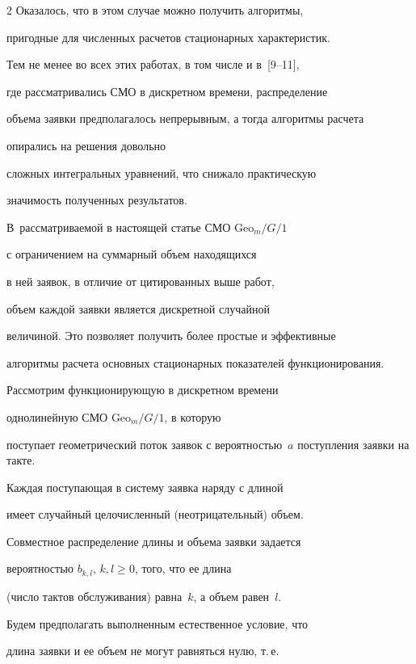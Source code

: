 \begin{multicols}{2}
Оказалось, что в этом случае можно получить алгоритмы,


пригодные для численных расчетов стационарных характеристик.





Тем не менее во всех этих работах, в том числе и в~[9--11],


где рассматривались СМО в дискретном времени, распределение


объема заявки предполагалось непрерывным, а тогда алгоритмы расчета 


опира\-лись на решения довольно


сложных интегральных уравнений, что снижало практическую


значимость полученных результатов. 


В~рас\-смат\-ри\-ва\-емой в настоящей статье СМО Geo$_m/G/1$


с ограничением на суммарный объем находящихся


в ней заявок, в отличие от цитированных выше работ,


объем каждой заявки является дискретной случайной


величиной. Это позволяет получить более прос\-тые и эффективные


алгоритмы рас\-че\-та основных стационарных показателей функционирования.





Рассмотрим функционирующую в дискретном времени


однолинейную СМО Geo$_m/G/1$, в которую


поступает геометрический поток заявок с ве\-ро\-ят\-ностью~$a$ поступления заявки на такте.





Каждая поступающая в систему заявка наряду с длиной


имеет случайный целочисленный (не\-от\-ри\-ца\-тель\-ный) объем.


Совместное распределение длины и объема заявки задается


вероятностью $b_{k,l}$,  $k,l\ge 0$, того, что ее длина


(число тактов обслуживания) равна~$k$, а объем равен~$l$.


Будем предполагать выполненным естественное условие, что


длина заявки и ее объем не могут равняться нулю, т.\,е.\



\end{multicols}
